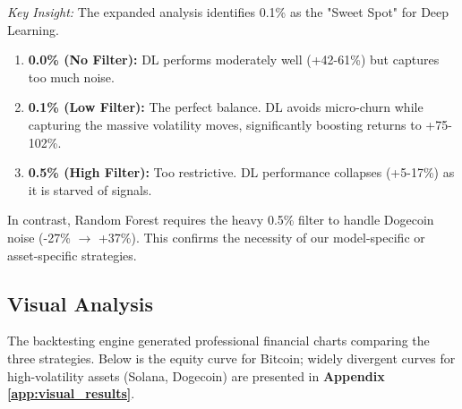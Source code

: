 \documentclass[11pt,a4paper]{article}
\begin{document}
\begin{table}[H]
\centering
\caption{Sensitivity Analysis: Impact of Threshold on Total Return}
\label{tab:threshold_impact}
\end{table}

\textit{Key Insight:} The expanded analysis identifies 0.1\% as the "Sweet Spot" for Deep Learning.
\begin{enumerate}
    \item \textbf{0.0\% (No Filter):} DL performs moderately well (+42-61\%) but captures too much noise.
    \item \textbf{0.1\% (Low Filter):} The perfect balance. DL avoids micro-churn while capturing the massive volatility moves, significantly boosting returns to +75-102\%.
    \item \textbf{0.5\% (High Filter):} Too restrictive. DL performance collapses (+5-17\%) as it is starved of signals.
\end{enumerate}
In contrast, Random Forest requires the heavy 0.5\% filter to handle Dogecoin noise (-27\% $\to$ +37\%). This confirms the necessity of our model-specific or asset-specific strategies.

\subsection{Visual Analysis}
The backtesting engine generated professional financial charts comparing the three strategies. Below is the equity curve for Bitcoin; widely divergent curves for high-volatility assets (Solana, Dogecoin) are presented in \textbf{Appendix \ref{app:visual_results}}.
\end{document}
